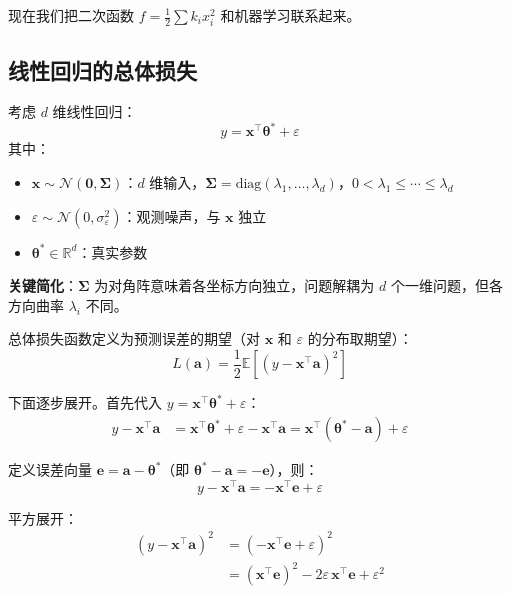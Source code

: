 \documentclass[12pt, a4paper]{ctexart}
\begin{document}
现在我们把二次函数 $f = \frac{1}{2}\sum k_i x_i^2$ 和机器学习联系起来。

\subsection{线性回归的总体损失}

考虑 $d$ 维线性回归：
\begin{equation}
    y = \mathbf{x}^\top \boldsymbol{\theta}^* + \varepsilon
\end{equation}
其中：
\begin{itemize}
    \item $\mathbf{x} \sim \mathcal{N}(\mathbf{0}, \boldsymbol{\Sigma})$：$d$ 维输入，$\boldsymbol{\Sigma} = \text{diag}(\lambda_1, \ldots, \lambda_d)$，$0 < \lambda_1 \leq \cdots \leq \lambda_d$
    \item $\varepsilon \sim \mathcal{N}(0, \sigma_\varepsilon^2)$：观测噪声，与 $\mathbf{x}$ 独立
    \item $\boldsymbol{\theta}^* \in \mathbb{R}^d$：真实参数
\end{itemize}

\textbf{关键简化}：$\boldsymbol{\Sigma}$ 为对角阵意味着各坐标方向独立，问题解耦为 $d$ 个一维问题，但各方向曲率 $\lambda_i$ 不同。

总体损失函数定义为预测误差的期望（对 $\mathbf{x}$ 和 $\varepsilon$ 的分布取期望）：
\begin{equation}
    L(\mathbf{a}) = \frac{1}{2}\mathbb{E}\left[(y - \mathbf{x}^\top\mathbf{a})^2\right]
\end{equation}

下面逐步展开。首先代入 $y = \mathbf{x}^\top\boldsymbol{\theta}^* + \varepsilon$：
\begin{align}
    y - \mathbf{x}^\top\mathbf{a} &= \mathbf{x}^\top\boldsymbol{\theta}^* + \varepsilon - \mathbf{x}^\top\mathbf{a} = \mathbf{x}^\top(\boldsymbol{\theta}^* - \mathbf{a}) + \varepsilon
\end{align}

定义误差向量 $\mathbf{e} = \mathbf{a} - \boldsymbol{\theta}^*$（即 $\boldsymbol{\theta}^* - \mathbf{a} = -\mathbf{e}$），则：
\begin{equation}
    y - \mathbf{x}^\top\mathbf{a} = -\mathbf{x}^\top\mathbf{e} + \varepsilon
\end{equation}

平方展开：
\begin{align}
    (y - \mathbf{x}^\top\mathbf{a})^2 &= (-\mathbf{x}^\top\mathbf{e} + \varepsilon)^2 \\
    &= (\mathbf{x}^\top\mathbf{e})^2 - 2\varepsilon\,\mathbf{x}^\top\mathbf{e} + \varepsilon^2
\end{align}
\end{document}
